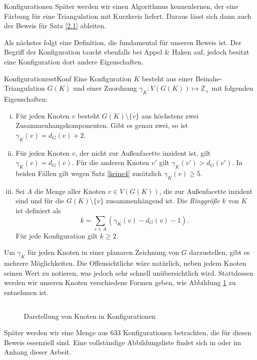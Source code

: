 \begin{section}{Konfigurationen}
 Später werden wir einen Algorithmus kennenlernen, der eine Färbung für eine Triangulation mit Kurzkreis liefert. Daraus lässt sich dann auch der Beweis für Satz \ref{2.1} ableiten.
 
 Als nächstes folgt eine Definition, die fundamental für unseren Beweis ist. Der Begriff der Konfiguration taucht ebenfalls bei Appel \& Haken auf, jedoch besitzt eine Konfiguration dort andere Eigenschaften.
  
 \begin{definitionl}{Konfiguration}{rsstKonf}
  Eine Konfiguration $K$ besteht aus einer Beinahe-Triangulation $G(K)$ und einer Zuordnung $\gamma_K : V(G(K)) \mapsto \mathbb{Z}_+$ mit folgenden Eigenschaften:
  \begin{enumerate}[i)]
   \item Für jeden Knoten $v$ besteht $G(K) \setminus \{v\}$ aus höchstens zwei Zusammenhangskomponenten. Gibt es genau zwei, so ist $\gamma_K(v) = d_G(v) + 2$.
   \item Für jeden Knoten $v$, der nicht zur Außenfacette inzident ist, gilt $\gamma_K(v) = d_G(v)$. Für die anderen Knoten $v'$ gilt $\gamma_K(v') > d_G(v')$. In beiden Fällen gilt wegen Satz \ref{keine4} zusätzlich $\gamma_K(v) \geq 5$.
   \item Sei $A$ die Menge aller Knoten $v \in V(G(K))$, die zur Außenfacette inzident sind und für die $G(K) \setminus \{v\}$ zusammenhängend ist. Die \textit{Ringgröße} $k$ von $K$ ist definiert als 
   \[ k = \sum_{v\in A} (\gamma_K(v) - d_G(v) - 1)\text{.}\] 
   Für jede Konfiguration gilt $k \geq 2$.
  \end{enumerate}
 \end{definitionl}
 
 Um $\gamma_K$ für jeden Knoten in einer planaren Zeichnung von $G$ darzustellen, gibt es mehrere Möglichkeiten. Die Offensichtliche wäre natürlich, neben jedem Knoten seinen Wert zu notieren, was jedoch sehr schnell unübersichtlich wird. Stattdessen werden wir unseren Knoten verschiedene Formen geben, wie Abbildung \ref{fig1} zu entnehmen ist.
 
 \begin{figure}[ht]
  \label{fig1}
  \[  \]
  \caption[Darstellung von Knoten in Konfigurationen]{Darstellung von Knoten in Konfigurationen}
 \end{figure}

 
 Später werden wir eine Menge aus 633 Konfigurationen betrachten, die für diesen Beweis essenziell sind. Eine vollständige Abbildungsliste findet sich in \cite[Seite 35]{FourRSST} oder im Anhang dieser Arbeit. 
 

\end{section}

